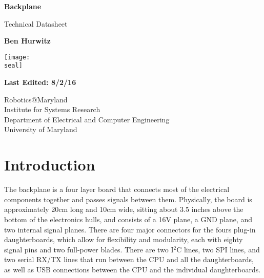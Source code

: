 \documentclass{article}
\makeatletter
\newcommand{\assignmentType}{Technical Datasheet}
\newcommand{\assignmentTitle}{Backplane}
\newcommand{\lastEdited}{8/2/16}
\newcommand{\courseTitle}{Robotics@Maryland}
\newcommand{\prof}{Institute for Systems Research}
\newcommand{\dept}{Department of Electrical and Computer Engineering}
\newcommand{\univ}{University of Maryland}
\newcommand{\seal}{C:/UMD_seal.png}
\newcommand{\student}{Ben Hurwitz}
\makeatother
\begin{document}

\begin{titlepage}
    \begin{center}
        \vspace*{1cm}
        
        \Huge
        \textbf{\assignmentTitle}
        
        \vspace{0.5cm}
        \LARGE
        \assignmentType
        
        \vspace{1.5cm}
        
        \textbf{\student}
        
        \vfill
        
        \vspace{0.6cm}
        
        \texttt{[image: \\seal]}
        
        \vspace{1.5cm}
        
        \textbf{Last Edited: \lastEdited}
        
        \vfill
        
        \Large
        \courseTitle \\
        \prof \\
        \dept \\
        \univ \\
        
    \end{center}
\end{titlepage}

\tableofcontents

\section{Introduction}
The backplane is a four layer board that connects most of the electrical components together and passes signals between them. Physically, the board is approximately 20cm long and 10cm wide, sitting about 3.5 inches above the bottom of the electronics hulls, and consists of a 16V plane, a GND plane, and two internal signal planes. There are four major connectors for the fours plug-in daughterboards, which allow for flexibility and modularity, each with eighty signal pins and two full-power blades. There are two I$^2$C lines, two SPI lines, and two serial RX/TX lines that run between the CPU and all the daughterboards, as well as USB connections between the CPU and the individual daughterboards. 
\end{document}

